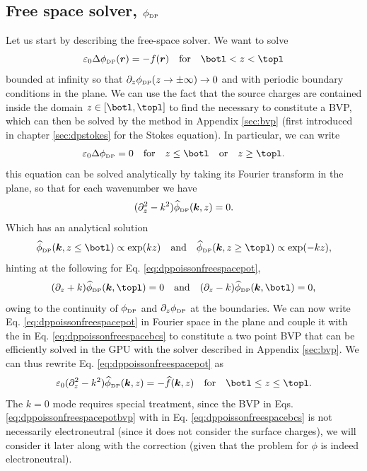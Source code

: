 \documentclass[ twoside,openright,titlepage,numbers=noenddot,%
headinclude,footinclude,cleardoublepage=empty,abstract=on,
BCOR=5mm,paper=b5,fontsize=11pt, dvipsnames
]{scrreprt}
\renewcommand{\vec}[1]{\bm{#1}}
\newcommand{\gpu}{\gls{GPU}\xspace}
\newcommand{\fou}[1]{\widehat{#1}}
\newcommand{\fpos}{r}
\newcommand{\dpr}{\text{\tiny DP}}
\begin{document}
\subsection{Free space solver, $\phi_{\dpr}$}\label{sec:dpsolver}
Let us start by describing the free-space solver. We want to solve
\begin{equation}
  \label{eq:dppoissonfreespacepot}
  \varepsilon_0 \Delta \phi_{\dpr}(\vec{\fpos}) = -f(\vec{\fpos}) \quad \text{for}\quad \botl<z<\topl
\end{equation}
bounded at infinity so that $\partial_z\phi_{\dpr}(z \rightarrow \pm \infty) \rightarrow 0$ and with periodic boundary conditions in the plane.
We can use the fact that the source charges are contained inside the domain $z\in[\botl, \topl]$ to find the necessary \bcs to constitute a \gls{BVP}, which can then be solved by the method in Appendix \ref{sec:bvp} (first introduced in chapter \ref{sec:dpstokes} for the Stokes equation). In particular, we can write
\begin{equation}
  \varepsilon_0 \Delta \phi_{\dpr} = 0\quad\text{for}\quad z\le\botl \quad\text{or}\quad z\ge \topl.
\end{equation}
this equation can be solved analytically by taking its Fourier transform in the plane, so that for each wavenumber we have
\begin{equation}
  (\partial_z^2 - k^2)\fou{\phi}_{\dpr}(\vec{k}, z) = 0.
\end{equation}
Which has an analytical solution
\begin{equation}
  \fou{\phi}_{\dpr}(\vec{k}, z \le \botl) \propto \exp(kz)\quad\text{and}\quad\fou{\phi}_{\dpr}(\vec{k}, z \ge \topl) \propto \exp(-kz),
\end{equation}
hinting at the following \bcs for Eq. \eqref{eq:dppoissonfreespacepot},
\begin{equation}
  \label{eq:dppoissonfreespacebcs}
  (\partial_z + k)\fou{\phi}_{\dpr}(\vec{k}, \topl) = 0\quad\text{and}\quad(\partial_z - k)\fou{\phi}_{\dpr}(\vec{k}, \botl) = 0, 
\end{equation}
owing to the continuity of $\phi_{\dpr}$ and $\partial_z\phi_{\dpr}$ at the boundaries.
We can now write Eq. \eqref{eq:dppoissonfreespacepot} in Fourier space in the plane and couple it with the \bcs in Eq. \eqref{eq:dppoissonfreespacebcs} to constitute a two point \gls{BVP} that can be efficiently solved in the \gpu with the solver described in Appendix \ref{sec:bvp}. We can thus rewrite Eq. \eqref{eq:dppoissonfreespacepot} as
\begin{equation}
  \label{eq:dppoissonfreespacepotbvp}
  \varepsilon_0(\partial_z^2 - k^2)\fou{\phi}_{\dpr}(\vec{k}, z) = -\fou{f}(\vec{k}, z) \quad \text{for}\quad \botl\le z\le \topl.
\end{equation}
The $k=0$ mode requires special treatment, since the \gls{BVP} in Eqs. \eqref{eq:dppoissonfreespacepotbvp} with \bcs in Eq. \eqref{eq:dppoissonfreespacebcs} is not necessarily electroneutral (since it does not consider the surface charges), we will consider it later along with the correction (given that the problem for $\phi$ is indeed electroneutral).
\end{document}
